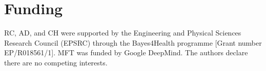 \section*{Funding}

RC, AD, and CH were supported by the Engineering and Physical Sciences Research Council (EPSRC) through the Bayes4Health programme [Grant number EP/R018561/1].
MFT was funded by Google DeepMind.
The authors declare there are no competing interests.